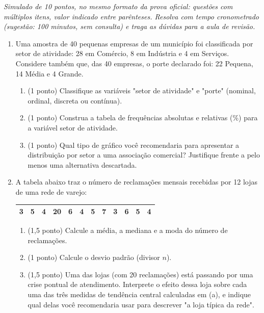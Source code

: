 \documentclass[11pt]{article}
\begin{document}

\noindent \textit{Simulado de 10 pontos, no mesmo formato da prova oficial: questões com múltiplos
itens, valor indicado entre parênteses. Resolva com tempo cronometrado (sugestão: 100 minutos,
sem consulta) e traga as dúvidas para a aula de revisão.}

\begin{enumerate}

\item Uma amostra de 40 pequenas empresas de um município foi classificada por setor de atividade:
28 em Comércio, 8 em Indústria e 4 em Serviços. Considere também que, das 40 empresas, o porte
declarado foi: 22 Pequena, 14 Média e 4 Grande.

\begin{enumerate}
  \item (1 ponto) Classifique as variáveis "setor de atividade" e "porte" (nominal, ordinal,
    discreta ou contínua).
  \item (1 ponto) Construa a tabela de frequências absolutas e relativas (\%) para a variável
    setor de atividade.
  \item (1 ponto) Qual tipo de gráfico você recomendaria para apresentar a distribuição por setor a
    uma associação comercial? Justifique frente a pelo menos uma alternativa descartada.
\end{enumerate}

\item A tabela abaixo traz o número de reclamações mensais recebidas por 12 lojas de uma rede de
varejo:

\begin{center}
\begin{tabular}{cccccccccccc}
\toprule
3 & 5 & 4 & 20 & 6 & 4 & 5 & 7 & 3 & 6 & 5 & 4 \\
\bottomrule
\end{tabular}
\end{center}

\begin{enumerate}
  \item (1,5 ponto) Calcule a média, a mediana e a moda do número de reclamações.
  \item (1 ponto) Calcule o desvio padrão (divisor $n$).
  \item (1,5 ponto) Uma das lojas (com 20 reclamações) está passando por uma crise pontual de
    atendimento. Interprete o efeito dessa loja sobre cada uma das três medidas de tendência
    central calculadas em (a), e indique qual delas você recomendaria usar para descrever "a loja
    típica da rede".
\end{enumerate}


\end{enumerate}
\end{document}
